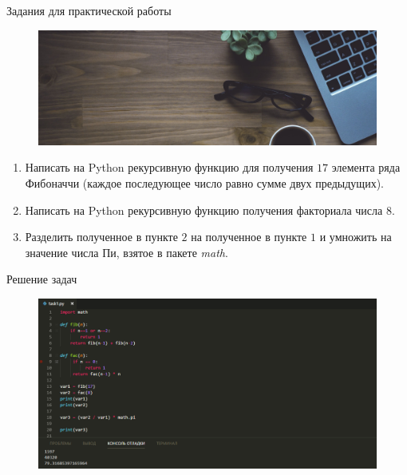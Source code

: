 \documentclass[8pt,pdf,hyperref={unicode}, xcolor=dvipsnames, fleqn]{beamer}
\begin{document}
\begin{frame}{Задания для практической работы}
\begin{figure}
	\includegraphics[width=1.0\textwidth]{Images/codingtime.jpg}
\end{figure}
\begin{enumerate}
	\item Написать на Python рекурсивную функцию для получения $ 17 $ элемента ряда  Фибоначчи (каждое последующее число равно сумме двух предыдущих).
	\item Написать на Python рекурсивную функцию получения факториала числа $8$.
	\item Разделить полученное в пункте $ 2 $ на полученное в пункте $ 1 $ и умножить на значение числа Пи, взятое в пакете \textit{math}.
\end{enumerate}

\end{frame}
\begin{frame}{Решение задач}
\begin{figure}
	\includegraphics[width=1.0\textwidth]{Images/task1.PNG}
\end{figure}


\end{frame}
\end{document}
